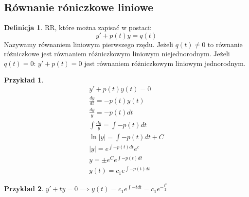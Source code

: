 \documentclass{article}
\theoremstyle{definition}
\newtheorem{de}{Definicja}[subsection]
\theoremstyle{definition}
\theoremstyle{definition}
\newtheorem{pk}{Przykład}[subsection]
\theoremstyle{definition}
\begin{document}
\subsection{Równanie róniczkowe liniowe}

\begin{de}
    RR, które można zapisać w postaci:
    \[y' + p(t)y = q(t)\]
    Nazywamy równaniem liniowym pierwszego rzędu.
    Jeżeli $q(t)\neq 0$ to równanie różniczkowe jest równaniem różniczkowym liniowym niejednorodnym.
    Jeżeli $q(t)=0$: $y'+p(t)=0$ jest równaniem różniczkowym liniowym jednorodnym.
\end{de}

\begin{pk}
    \begin{align}
        y' + p(t)y(t) = 0\\
        \frac{dy}{dt} = -p(t)y(t)\\
        \frac{dy}{y} = -p(t)dt\\
        \int \frac{dy}{y} = \int -p(t) dt\\
        \ln|y| = \int -p(t) dt + C\\
        |y| = e^{\int -p(t) dt} e^{c}\\
        y=\pm e^C e^{\int -p(t) dt}\\
        y(t) = c_1 e^{\int -p(t) dt} 
    \end{align}
\end{pk}

\begin{pk}
    $y' + ty = 0 \implies y(t) = c_1 e^{\int -t dt} = c_1 e^{-\frac{t^2}{2}}$
\end{pk}
\end{document}
